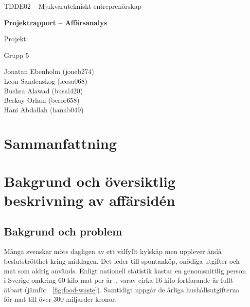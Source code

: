\documentclass[a4paper,12pt]{article}
\begin{document}
\begin{titlepage}
    \centering

    {\Large TDDE02 – Mjukvarutekniskt entreprenörskap\par}
    \vspace{2cm}

    {\LARGE \textbf{Projektrapport – Affärsanalys}}\par
    \vspace{1.5cm}

    {\large Projekt: \par}
    \vspace{1cm}

    {\large Grupp 5\par}
    \vspace{0.5cm}

   
    {\small

    Jonatan Ebenholm (joneb274)\\
   Leon Sandenskog (leosa068)\\
   Bushra Alawad (busal420)\\
   Berkay Orhan (beror658)\\
   Hani Abdallah (hanab049)
    }\par

    \vfill
    {\large \par}

\end{titlepage}


\newpage
\tableofcontents

\newpage


\section{Sammanfattning}


\section{Bakgrund och översiktlig beskrivning av affärsidén}

\subsection{Bakgrund och problem}
Många svenskar möts dagligen av ett välfyllt kylskåp men upplever ändå beslutströtthet kring middagen. Det leder till spontanköp, onödiga utgifter och mat som aldrig används. Enligt nationell statistik kastar en genomsnittlig person i Sverige omkring 60 kilo mat per år~\cite{naturvardsverket-matavfall}, varav cirka 16 kilo fortfarande är fullt ätbart (jämför \figurename~\ref{fig:food-waste}). Samtidigt uppgår de årliga hushållsutgifterna för mat till över 300 miljarder kronor.
\end{document}
